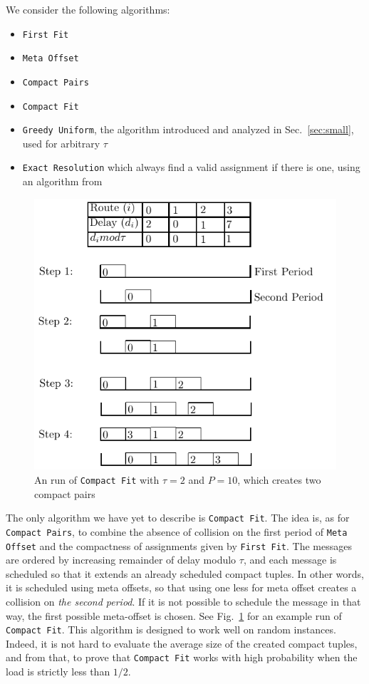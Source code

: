 \documentclass[a4paper,UKenglish,cleveref, autoref, thm-restate]{lipics-v2019}
\newcommand\firstfit{\texttt{First Fit}\xspace}
\newcommand\compactpair{\texttt{Compact Pairs}\xspace}
\newcommand\metaoffset{\texttt{Meta Offset}\xspace}
\newcommand\greedyuniform{\texttt{Greedy Uniform}\xspace}
\newcommand\compactfit{\texttt{Compact Fit}\xspace}
\begin{document}
We consider the following algorithms:
\begin{itemize}
  \item \firstfit
  \item \metaoffset
  \item \compactpair
  \item \compactfit
  \item \greedyuniform, the algorithm introduced and analyzed in Sec.~\ref{sec:small}, used for arbitrary $\tau$
  \item \texttt{Exact Resolution} which always find a valid assignment if there is one, using an algorithm from~\cite{dominique2018deterministic}  
\end{itemize}

\begin{figure}[h]
 \begin{center}
\includegraphics[scale=1]{compactfit}
\end{center}
\caption{An run of \compactfit with $\tau = 2$ and $P=10$, which creates two compact pairs}
\label{fig:compactfit}
\end{figure}

The only algorithm we have yet to describe is \compactfit. The idea is, as for \compactpair, to combine the absence of collision on the first period of \metaoffset and the compactness of assignments given by \firstfit.
The messages are ordered by increasing remainder of delay modulo $\tau$, and each message is scheduled so that it extends an already scheduled compact tuples. 
In other words, it is scheduled using meta offsets, so that using one less for meta offset creates a collision on \emph{the second period}. If it is not possible to schedule the message in that way, the first possible meta-offset is chosen. See Fig.~\ref{fig:compactfit} for an example run of \compactfit. This algorithm is designed to work well on random instances. Indeed, it 
is not hard to evaluate the average size of the created compact tuples, and from that, to prove that \compactfit works with high probability when the load is strictly less than $1/2$.
\end{document}
